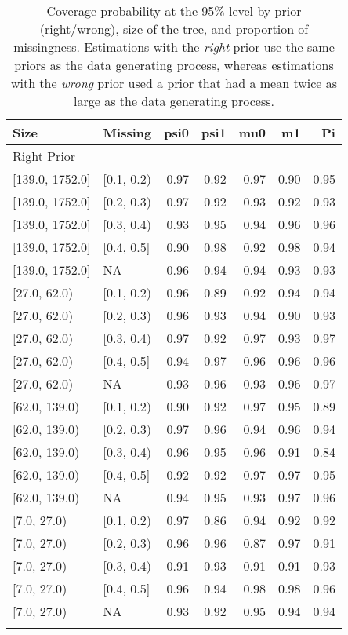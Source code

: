 \begin{table}[ht]
\centering
\begin{tabular}{llrrrrr}
  \toprule
Size & Missing & psi0 & psi1 & mu0 & m1 & Pi \\ 
  \midrule
\multicolumn{7}{l}{Right Prior}\\
{[139.0, 1752.0]} & {[0.1, 0.2)} & 0.97 & 0.92 & 0.97 & 0.90 & 0.95 \\ 
  {[139.0, 1752.0]} & {[0.2, 0.3)} & 0.97 & 0.92 & 0.93 & 0.92 & 0.93 \\ 
  {[139.0, 1752.0]} & {[0.3, 0.4)} & 0.93 & 0.95 & 0.94 & 0.96 & 0.96 \\ 
  {[139.0, 1752.0]} & {[0.4, 0.5]} & 0.90 & 0.98 & 0.92 & 0.98 & 0.94 \\ 
  {[139.0, 1752.0]} & {NA} & 0.96 & 0.94 & 0.94 & 0.93 & 0.93 \\ 
  {[27.0, 62.0)} & {[0.1, 0.2)} & 0.96 & 0.89 & 0.92 & 0.94 & 0.94 \\ 
  {[27.0, 62.0)} & {[0.2, 0.3)} & 0.96 & 0.93 & 0.94 & 0.90 & 0.93 \\ 
  {[27.0, 62.0)} & {[0.3, 0.4)} & 0.97 & 0.92 & 0.97 & 0.93 & 0.97 \\ 
  {[27.0, 62.0)} & {[0.4, 0.5]} & 0.94 & 0.97 & 0.96 & 0.96 & 0.96 \\ 
  {[27.0, 62.0)} & {NA} & 0.93 & 0.96 & 0.93 & 0.96 & 0.97 \\ 
  {[62.0, 139.0)} & {[0.1, 0.2)} & 0.90 & 0.92 & 0.97 & 0.95 & 0.89 \\ 
  {[62.0, 139.0)} & {[0.2, 0.3)} & 0.97 & 0.96 & 0.94 & 0.96 & 0.94 \\ 
  {[62.0, 139.0)} & {[0.3, 0.4)} & 0.96 & 0.95 & 0.96 & 0.91 & 0.84 \\ 
  {[62.0, 139.0)} & {[0.4, 0.5]} & 0.92 & 0.92 & 0.97 & 0.97 & 0.95 \\ 
  {[62.0, 139.0)} & {NA} & 0.94 & 0.95 & 0.93 & 0.97 & 0.96 \\ 
  {[7.0, 27.0)} & {[0.1, 0.2)} & 0.97 & 0.86 & 0.94 & 0.92 & 0.92 \\ 
  {[7.0, 27.0)} & {[0.2, 0.3)} & 0.96 & 0.96 & 0.87 & 0.97 & 0.91 \\ 
  {[7.0, 27.0)} & {[0.3, 0.4)} & 0.91 & 0.93 & 0.91 & 0.91 & 0.93 \\ 
  {[7.0, 27.0)} & {[0.4, 0.5]} & 0.96 & 0.94 & 0.98 & 0.98 & 0.96 \\ 
  {[7.0, 27.0)} & {NA} & 0.93 & 0.92 & 0.95 & 0.94 & 0.94 \\ 
   \bottomrule
\multicolumn{7}{l}{}\\
\end{tabular}
\caption{Coverage probability at the 95\% level by prior (right/wrong), size of the tree, and proportion of missingness.  Estimations with the \emph{right} prior use the same priors as the data generating process, whereas estimations with the \emph{wrong} prior used a prior that had a mean twice as large as the data generating process.} 
\label{tab:coverage95-method-size-missigness}
\end{table}
